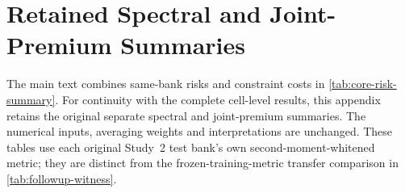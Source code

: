\section{Retained Spectral and Joint-Premium Summaries}
\label{app:retained-summaries}
The main text combines same-bank risks and constraint costs in \cref{tab:core-risk-summary}. For continuity with the complete cell-level results, this appendix retains the original separate spectral and joint-premium summaries. The numerical inputs, averaging weights and interpretations are unchanged. These tables use each original Study~2 test bank's own second-moment-whitened metric; they are distinct from the frozen-training-metric transfer comparison in \cref{tab:followup-witness}.



\begin{table}[t]
\centering\small

\caption{Same-metric reference and class-risk premium at $r=16$ on the original Study~2 test bank. Each domain averages \BoundedCellsPerDomain{} fixed cells equally. $p^-=\max\{0,2(1-\gamma_r)-\eta\}$ and $p^+=2(1-\gamma_r^2)-\eta$ are computed per cell before averaging. They bound the mean cost of imposing exact laws and orthogonality jointly. $L(I)$ uses total trivial energy and was also checked by direct residuals on the saved coordinates. These are finite-bank quantities, not transfer losses or confidence limits.}
\label{tab:bounded-risk}
\end{table}
